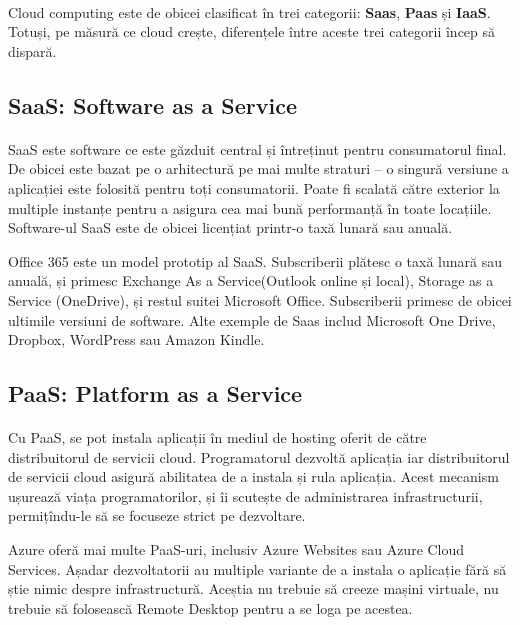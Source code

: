 \paragraph{ } Cloud computing este de obicei clasificat în trei categorii: \textbf{Saas}, \textbf{Paas} și \textbf{IaaS}. Totuși, pe măsură ce cloud crește, diferențele între aceste trei categorii încep să dispară.

\subsection{SaaS: Software as a Service}
\vspace{1cm}
\paragraph{ } SaaS este software ce este găzduit central și întreținut pentru consumatorul final. De obicei este bazat pe o arhitectură pe mai multe straturi – o singură versiune a aplicației este folosită pentru toți consumatorii. Poate fi scalată către exterior la multiple instanțe pentru a asigura cea mai bună performanță în toate locațiile. Software-ul SaaS este de obicei licențiat printr-o taxă lunară sau anuală.

Office 365 este un model prototip al SaaS. Subscriberii plătesc o taxă lunară sau anuală, și primesc Exchange As a Service(Outlook online și local), Storage as a Service (OneDrive), și restul suitei Microsoft Office. Subscriberii primesc de obicei ultimile versiuni de software.
Alte exemple de Saas includ Microsoft One Drive, Dropbox, WordPress sau Amazon Kindle.\cite{20}

\subsection{PaaS: Platform as a Service}
\vspace{1cm}
\paragraph{ } Cu PaaS, se pot instala aplicații în mediul de hosting oferit de către distribuitorul de servicii cloud. Programatorul dezvoltă aplicația iar distribuitorul de servicii cloud asigură abilitatea de a instala și rula aplicația. Acest mecanism ușurează viața programatorilor, și îi scutește de administrarea infrastructurii, permițîndu-le să se focuseze strict pe dezvoltare.

Azure oferă mai multe PaaS-uri, inclusiv Azure Websites sau Azure Cloud Services. Așadar dezvoltatorii au multiple variante de a instala o aplicație fără să știe nimic despre infrastructură. Aceștia nu trebuie să creeze mașini virtuale, nu trebuie să folosească Remote Desktop pentru a se loga pe acestea. 


